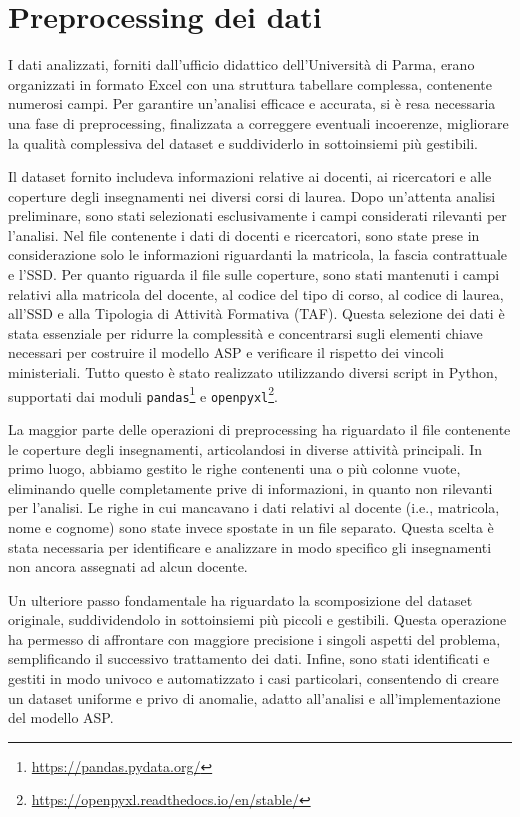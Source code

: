\section{Preprocessing dei dati}
\label{sec:pre-proc}

I dati analizzati, forniti dall'ufficio didattico dell'Università di Parma, 
erano organizzati in formato Excel con una struttura tabellare complessa, contenente 
numerosi campi. Per garantire un'analisi efficace e accurata, si è resa necessaria una 
fase di preprocessing, finalizzata a correggere eventuali incoerenze, migliorare la 
qualità complessiva del dataset e suddividerlo in sottoinsiemi più gestibili.

Il dataset fornito includeva informazioni relative ai docenti, ai ricercatori e alle 
coperture degli insegnamenti nei diversi corsi di laurea. Dopo un'attenta analisi 
preliminare, sono stati selezionati esclusivamente i campi considerati rilevanti per 
l'analisi. Nel file contenente i dati di docenti e ricercatori, sono state prese in 
considerazione solo le informazioni riguardanti la matricola, la fascia contrattuale 
e l'SSD. Per quanto riguarda il file sulle coperture, sono stati mantenuti i campi 
relativi alla matricola del docente, al codice del tipo di corso, al codice 
di laurea, all'SSD e alla Tipologia di Attività Formativa (TAF). 
Questa selezione dei dati è stata essenziale per ridurre la complessità e concentrarsi 
sugli elementi chiave necessari per costruire il modello ASP e verificare il rispetto 
dei vincoli ministeriali. Tutto questo è stato realizzato utilizzando diversi script in 
Python, supportati dai moduli \texttt{pandas}\footnote{\url{https://pandas.pydata.org/}} 
e \texttt{openpyxl}\footnote{\url{https://openpyxl.readthedocs.io/en/stable/}}.

La maggior parte delle operazioni di preprocessing ha riguardato il file contenente 
le coperture degli insegnamenti, articolandosi in diverse attività principali. 
In primo luogo, abbiamo gestito le righe contenenti una o più colonne vuote, 
eliminando quelle completamente prive di informazioni, in quanto non rilevanti 
per l'analisi. Le righe in cui mancavano i dati relativi al docente (i.e., matricola, 
nome e cognome) sono state invece spostate in un file separato. Questa scelta è stata 
necessaria per identificare e analizzare in modo specifico gli insegnamenti non 
ancora assegnati ad alcun docente.

Un ulteriore passo fondamentale ha riguardato la scomposizione del dataset originale, 
suddividendolo in sottoinsiemi più piccoli e gestibili. Questa operazione ha permesso 
di affrontare con maggiore precisione i singoli aspetti del problema, semplificando il 
successivo trattamento dei dati. Infine, sono stati identificati e gestiti in modo 
univoco e automatizzato i casi particolari, consentendo di creare un dataset uniforme 
e privo di anomalie, adatto all'analisi e all'implementazione del modello ASP.

